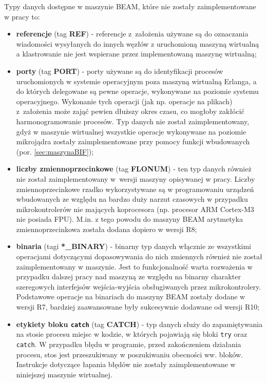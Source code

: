 Typy danych dostępne w maszynie BEAM, które nie zostały zaimplementowane w pracy to:
\begin{itemize}
\item \textbf{referencje} (tag \textbf{REF}) - referencje z~założenia używane są do oznaczania wiadomości wysyłanych do innych węzłów z uruchomioną maszyną wirtualną a klastrowanie nie jest wspierane przez implementowaną maszynę wirtualną;
\item \textbf{porty} (tag \textbf{PORT}) - porty używane są do identyfikacji procesów uruchomionych w systemie operacyjnym poza maszyną wirtualną Erlanga, a do których delegowane są pewne operacje, wykonywane na poziomie systemu operacyjnego. Wykonanie tych operacji (jak np. operacje na plikach) z~założenia może zająć pewien dłuższy okres czasu, co mogłoby zakłócić harmonogramowanie procesów. Typ danych nie został zaimplementowany, gdyż w maszynie wirtualnej wszystkie operacje wykonywane na poziomie mikrojądra zostały zaimplementowane przy pomocy funkcji wbudowanych (por. \ref{sec:maszynaBIF});
\item \textbf{liczby zmiennoprzecinkowe} (tag \textbf{FLONUM}) - ten typ danych również nie został zaimplementowany w~wersji maszyny opisywanej w pracy. Liczby zmiennoprzecinkowe rzadko wykorzystywane są w programowaniu urządzeń wbudowanych ze względu na bardzo duży narzut czasowych w przypadku mikrokontrolerów nie mających koprocesora (np. procesor ARM Cortex-M3 nie posiada FPU). M.in. z tego powodu do maszyny BEAM arytmetyka zmiennoprzecinkowa została dodana dopiero w wersji R8;
\item \textbf{binaria} (tagi \textbf{*\_BINARY}) - binarny typ danych włącznie ze wszystkimi operacjami dotyczącymi dopasowywania do nich zmiennych również nie został zaimplementowany w maszynie. Jest to funkcjonalność warta rozważenia w przypadku dalszej pracy nad maszyną ze względu na binarny charakter szeregowych interfejsów wejścia-wyjścia obsługiwanych przez mikrokontrolery. Podstawowe operacje na binariach do maszyny BEAM zostały dodane w wersji R7, bardziej zaawansowane były sukcesywnie dodawane od wersji R10;
\item \textbf{etykiety bloku \texttt{catch}} (tag \textbf{CATCH}) - typ danych służy do zapamiętywania na stosie procesu miejsc w kodzie, w których pojawiają się bloki \texttt{try} oraz \texttt{catch}. W przypadku błędu w programie, przed zakończeniem działania procesu, stos jest przeszukiwany w poszukiwaniu obecności ww. bloków. Instrukcje dotyczące łapania błędów nie zostały zaimplementowane w niniejszej maszynie wirtualnej.
\end{itemize}

